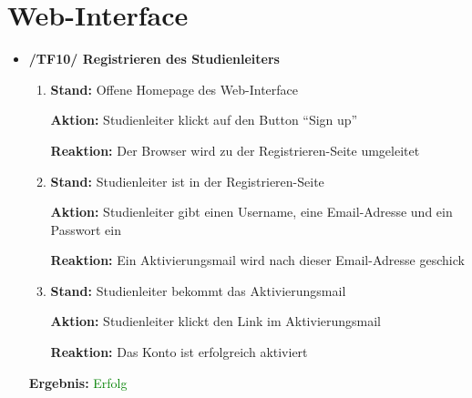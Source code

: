 \documentclass[a4paper]{scrreprt}
\begin{document}
	      \section{Web-Interface}
		      \begin{itemize}
		      		          \item \textbf{/TF10/ Registrieren des Studienleiters}
		      		          \begin{enumerate}
		      		               \item \par \textbf{Stand: }Offene Homepage des Web-Interface
    		      		                \par \textbf{Aktion: }Studienleiter klickt auf den Button ``Sign up''
    		      		                \par \textbf{Reaktion: }Der Browser wird zu der Registrieren-Seite umgeleitet
		      			            \item \par \textbf{Stand: }Studienleiter ist in der Registrieren-Seite
    		      		                \par \textbf{Aktion: }Studienleiter gibt einen Username, eine Email-Adresse und ein Passwort ein
    		      		                \par \textbf{Reaktion: }Ein Aktivierungsmail wird nach dieser Email-Adresse geschick
                                    \item \par \textbf{Stand: }Studienleiter bekommt das Aktivierungsmail
                                        \par \textbf{Aktion: }Studienleiter klickt den Link im Aktivierungsmail
                                        \par \textbf{Reaktion: }Das Konto ist erfolgreich aktiviert
		      		           \end{enumerate}
		      		           \vspace*{0.3cm}
		      		           \par \textbf{Ergebnis: }\textcolor{green}{Erfolg}
		      		           \vspace*{0.6cm}
		      		

\end{itemize}
\end{document}
